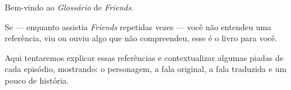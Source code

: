 Bem-vindo ao \emph{Glossário} de \emph{Friends}.

Se --- enquanto assistia \emph{Friends} repetidas vezes --- você não
entendeu uma referência, viu ou ouviu algo que não compreendeu, esse é o
livro para você.

Aqui tentaremos explicar essas referências e contextualizar algumas
piadas de cada episódio, mostrando: o personagem, a fala original, a
fala traduzida e um pouco de história.
